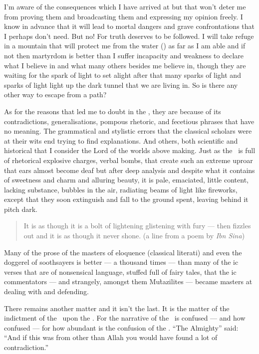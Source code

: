 \documentclass[12pt]{memoir}
\begin{document}
I’m aware of the consequences which I have arrived at but that won’t deter me
from proving them and broadcasting them and expressing my opinion freely. I
know in advance that it will lead to mortal dangers and grave confrontations
that I perhaps don’t need. But no! For truth deserves to be followed. I will
take refuge in a mountain that will protect me from the water
()
as far as I am able and if not then martyrdom is better than I suffer
incapacity and weakness to declare what I believe in and what many others
besides me believe in, though they are waiting for the spark of light to set
alight after that many sparks of light and sparks of light light up the dark
tunnel that we are living in. So is there any other way to escape from a path?

As for the reasons that led me to doubt in the \Quran, they are because of its
contradictions, generalisations, pompous rhetoric, and fecetious phrases that
have no meaning. The grammatical and stylistic errors that the classical
scholars were at their wits end trying to find explanations. And others, both
scientific and historical that I consider the Lord of the worlds above making.
Just as the \Quran\ is full of rhetorical explosive charges, verbal bombs, that
create such an extreme uproar that ears almost become deaf but after deep
analysis and despite what it contains of sweetness and charm and alluring
beauty, it is pale, emaciated, little content, lacking substance, bubbles in
the air, radiating beams of light like fireworks, except that they soon
extinguish and fall to the ground spent, leaving behind it pitch dark.

\begin{quote}
It is as though it is a bolt of lightening glistening with fury — then fizzles
out and it is as though it never shone.
(a line from a poem by \emph{Ibn Sina})
\end{quote}

Many of the prose of the masters of eloquence (classical literati)
and even the doggerel of soothsayers is better — a thousand times —
than many of the \Quran{}ic verses that are of nonsensical language,
stuffed full of fairy tales, that the \Quran{}ic commentators —
and strangely, amongst them Mu\`tazilites —
became masters at dealing with and defending.

There remains another matter and it isn’t the last. It is the matter of the
indictment of the \Quran\ upon the \Quran. For the narrative of the \Quran\ is
confused — and how confused — for how abundant is the confusion of the \Quran.
“The Almighty” said: “And if this was from other than Allah you would have
found a lot of contradiction.”
\end{document}
